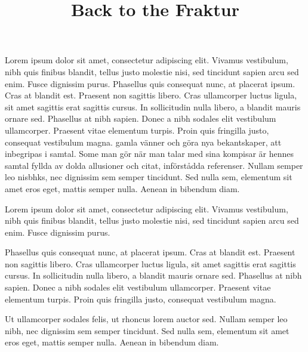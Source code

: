 

\Arno\currvar
\title{Back to the Fraktur}

L{\currvar orem ipsum dolor} sit amet, consectetur adipiscing elit. Vivamus vestibulum, nibh quis finibus blandit, tellus justo molestie nisi, sed tincidunt sapien arcu sed enim. Fusce dignissim purus. 
Phasellus quis consequat nunc, at placerat ipsum. Cras at blandit est. Praesent non sagittis libero. Cras ullamcorper luctus ligula, sit amet sagittis erat sagittis cursus. In sollicitudin nulla libero, a blandit mauris ornare sed. Phasellus at nibh sapien.  Donec a nibh sodales elit vestibulum ullamcorper. Praesent vitae elementum turpis. Proin quis fringilla justo, consequat vestibulum magna.
gamla vänner och göra nya bekantskaper, att inbegripas i samtal. 
Some
man gör när man talar med sina kompisar är hennes samtal fyllda av dolda allusioner och citat, införstådda referenser. 
Nullam semper leo nisbhks, nec dignissim sem semper tincidunt. Sed nulla sem, elementum sit amet eros eget, mattis semper nulla. Aenean in bibendum diam.

Lorem ipsum dolor sit amet, consectetur adipiscing elit. Vivamus vestibulum, nibh quis finibus blandit, tellus justo molestie nisi, sed tincidunt sapien arcu sed enim. Fusce dignissim purus. 

Phasellus quis consequat nunc, at placerat ipsum. Cras at blandit est. Praesent non sagittis libero. Cras ullamcorper luctus ligula, sit amet sagittis erat sagittis cursus. In sollicitudin nulla libero, a blandit mauris ornare sed. Phasellus at nibh sapien. Donec a nibh sodales elit vestibulum ullamcorper. Praesent vitae elementum turpis. Proin quis fringilla justo, consequat vestibulum magna. 

Ut ullamcorper sodales felis, ut rhoncus lorem auctor sed. Nullam semper leo nibh, nec dignissim sem semper tincidunt. Sed nulla sem, elementum sit amet eros eget, mattis semper nulla. Aenean in bibendum diam.

